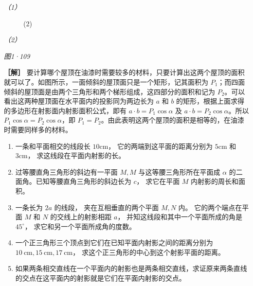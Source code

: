 \emph{（1）}

\begin{figure}
\centering
{}
\caption{(2)}
\end{figure}

\emph{（2）}

\emph{图1·109}

\textbf{［解］}
要计算哪个屋顶在油漆时需要较多的材料，只要计算出这两个屋顶的面积就可以了。如图所示，一面倾斜的屋顶面只是一个矩形，记其面积为
\(P_{1}\)；而四面倾斜的屋顶面是由两个三角形和两个梯形组成，这四部分的面积和记为
\(P_{2}\)。可以看出这两种屋顶面在水平面内的投影同为两边长为 \(a\) 和
\(b\) 的矩形，根据上面求得的多边形在射影面内射影面积公式，即有
\(a \cdot b = P_{1} \cos \alpha\) 及
\(a \cdot b = P_{2} \cos \alpha\)。所以
\(P_{1} \cos \alpha = P_{2} \cos \alpha\)，即
\(P_{1} = P_{2}\)。由此表明这两个屋顶的面积是相等的，在油漆时需要同样多的材料。

\begin{enumerate}
\item
  一条和平面相交的线段长 \(10\mathrm{cm}\)，
  它的两端到这平面的距离分别为 \(5\mathrm{cm}\) 和 \(3\mathrm{cm}\)，
  求这线段在平面内射影的长。
\item
  过等腰直角三角形的斜边有一平面 \(M, M\) 与这等腰三角形所在平面成
  \(\alpha\) 的二面角。已知等腰直角三角形的斜边长为 \(c\)， 求它在平面
  \(M\) 内射影的周长和面积。
\item
  一条长为 \(2a\) 的线段， 夹在互相垂直的两个平面 \(M, N\) 内。
  它的两个端点在平面 \(M\) 和 \(N\) 的交线上的射影相距 \(a\)，
  并知这线段和其中一个平面所成的角是 \(45^{\circ}\)，
  求它和另一个平面所成角的度数。
\item
  一个正三角形三个顶点到它们在已知平面内射影之间的距离分别为
  \(10 \mathrm{~cm}, 15 \mathrm{~cm}, 17 \mathrm{~cm}\)，
  求这个正三角形的中心到这个射影平面的距离。
\item
  如果两条相交直线在一个平面内的射影也是两条相交直线，求证原来两条直线的交点在这平面内的射影就是它们在平面内射影的交点。
\end{enumerate}

